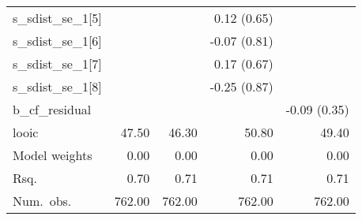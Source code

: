 \begin{center}
\begin{longtable}{l D{)}{)}{9)3} D{)}{)}{9)3} D{)}{)}{9)3} D{)}{)}{9)3}}
s\_sdist\_se\_1[5]         &                       &                       & 0.12 \; (0.65)        &                       \\
s\_sdist\_se\_1[6]         &                       &                       & -0.07 \; (0.81)       &                       \\
s\_sdist\_se\_1[7]         &                       &                       & 0.17 \; (0.67)        &                       \\
s\_sdist\_se\_1[8]         &                       &                       & -0.25 \; (0.87)       &                       \\
b\_cf\_residual            &                       &                       &                       & -0.09 \; (0.35)       \\
\midrule
looic                      & 47.50                 & 46.30                 & 50.80                 & 49.40                 \\
Model weights              & 0.00                  & 0.00                  & 0.00                  & 0.00                  \\
Rsq.                       & 0.70                  & 0.71                  & 0.71                  & 0.71                  \\
Num.\ obs.                 & 762.00                & 762.00                & 762.00                & 762.00                \\
\end{longtable}
\end{center}
